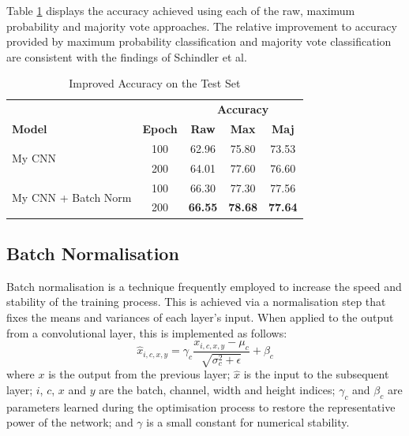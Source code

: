 \documentclass[conference]{IEEEtran}
\begin{document}
Table \ref{improved_results} displays the accuracy achieved using each of the raw, maximum probability and majority vote approaches.
The relative improvement to accuracy provided by maximum probability classification and majority vote classification are consistent with the findings of Schindler et al.

\begin{table}[htbp]
    \caption{Improved Accuracy on the Test Set}
    \begin{center}
    \begin{tabular}{l c c c c}
    \toprule
    &&\multicolumn{3}{c}{\textbf{Accuracy}}\\
    \cmidrule(lr){3-5}
    \textbf{Model}&\textbf{Epoch}&\textbf{Raw}&\textbf{Max}&\textbf{Maj}\\
    \midrule
    \multirow{ 2}{*}{My CNN} & 100 & 62.96 & 75.80 & 73.53 \\
    & 200 & 64.01 & 77.60 & 76.60 \\
    \midrule
    \multirow{ 2}{*}{My CNN + Batch Norm} & 100 & 66.30 & 77.30 & 77.56 \\
    & 200 & \textbf{66.55} & \textbf{78.68} & \textbf{77.64} \\
    \bottomrule
    \end{tabular}
    \label{improved_results}
    \end{center}
\end{table}

\subsection{Batch Normalisation}

Batch normalisation \cite{IoffeSzegedy} is a technique frequently employed to increase the speed and stability of the training process.
This is achieved via a normalisation step that fixes the means and variances of each layer's input.
When applied to the output from a convolutional layer, this is implemented as follows:
\[
\hat{x}_{i,c,x,y}=\gamma_c\frac{x_{i,c,x,y}-\mu_c}{\sqrt{\sigma_c^2+\epsilon}}+\beta_c
\]
where $x$ is the output from the previous layer; $\hat{x}$ is the input to the subsequent layer; $i$, $c$, $x$ and $y$ are the batch, channel, width and height indices; $\gamma_c$ and $\beta_c$ are parameters learned during the optimisation process to restore the representative power of the network; and $\gamma$ is a small constant for numerical stability.
\end{document}
